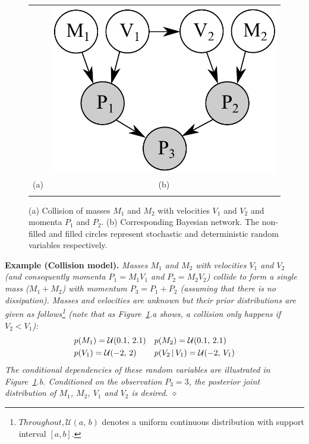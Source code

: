 \documentclass{article}
\newcommand{\pr}{p}
\begin{document}
\begin{figure}[t!]
\begin{center}
\begin{tabular}{cc}
& \hspace{6mm} \includegraphics[width=0.35\linewidth]{Figs/little-momentum1.pdf} 
\vspace{-1.5mm}
\\
\hspace{-5mm} \footnotesize(a) 
& \hspace{-4mm} \footnotesize(b)  \\
\multicolumn{2}{c}{}
\end{tabular}
\end{center}
\vspace{-8mm}
\caption{\footnotesize
(a) Collision of masses $M_1$ and $M_2$ with velocities $V_1$ and $V_2$ and momenta $P_1$ and $P_2$. 
(b) Corresponding Bayesian network. The non-filled and filled circles represent stochastic and deterministic random variables respectively.} 
\label{fig:mom0}
\vspace{-4mm}
\end{figure}


{\bf Example (Collision model). }
\emph{Masses $M_1$ and $M_2$ with velocities $V_1$ and $V_2$ (and consequently momenta $P_1 = M_1 V_1$ and $P_2 = M_2 V_2$) collide to form a single mass ($M_1 + M_2$) with momentum $P_3 = P_1 + P_2$ (assuming that there is no dissipation).
Masses and velocities are unknown but 
their prior distributions are given as follows\footnote{
$Throughout, \mathcal{U}(a, \, b)$ denotes a uniform continuous distribution 
with {\color{green} support interval} $[a, b]$.
} 
(note that as Figure~\ref{fig:mom0}.a shows, a collision only happens if $V_2 < V_1$):  
}%
\begin{align}\footnotesize
&\pr(M_1) = \mathcal{U}(0.1, \, 2.1) 
&&\pr(M_2) = \mathcal{U}(0.1, \, 2.1)
\nonumber
\\
&\pr(V_1) = \mathcal{U}(-2, \, 2)
&&\pr(V_2 \, | \, V_1) = \mathcal{U}(-2, \, V_1)
\label{e:collision}
\end{align} 
\emph{
The conditional dependencies of these random variables are illustrated in 
Figure~\ref{fig:mom0}.b.
Conditioned on the observation $P_3 = 3$, the posterior joint distribution of $M_1$, $M_2$, $V_1$ and $V_2$ is desired. 
\hspace*{\fill} $\diamond$} %
\end{document}
